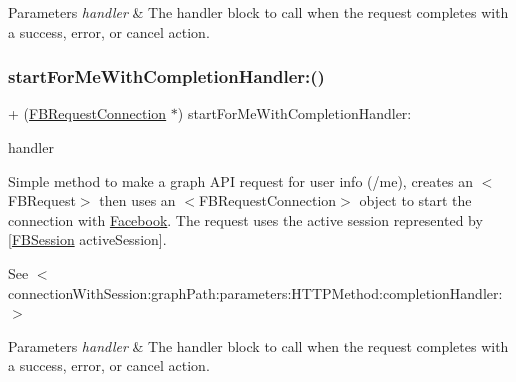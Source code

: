 \begin{DoxyParams}{Parameters}
{\em handler} & The handler block to call when the request completes with a success, error, or cancel action. \\
\hline
\end{DoxyParams}
\mbox{\label{interfaceFBRequestConnection_a9d89090f947eacfdf441172f842f5bc8}} 
\subsubsection{\texorpdfstring{start\+For\+Me\+With\+Completion\+Handler\+:()}{startForMeWithCompletionHandler:()}\hspace{0.1cm}{\footnotesize\ttfamily [2/5]}}
{\footnotesize\ttfamily + (\hyperlink{interfaceFBRequestConnection}{F\+B\+Request\+Connection} $\ast$) start\+For\+Me\+With\+Completion\+Handler\+: \begin{DoxyParamCaption}\item[{(F\+B\+Request\+Handler)}]{handler }\end{DoxyParamCaption}}

Simple method to make a graph A\+PI request for user info (/me), creates an $<$\+F\+B\+Request$>$ then uses an $<$\+F\+B\+Request\+Connection$>$ object to start the connection with \hyperlink{interfaceFacebook}{Facebook}. The request uses the active session represented by {\ttfamily \mbox{[}\hyperlink{interfaceFBSession}{F\+B\+Session} active\+Session\mbox{]}}.

See $<$connection\+With\+Session\+:graph\+Path\+:parameters\+:\+H\+T\+T\+P\+Method\+:completion\+Handler\+:$>$


\begin{DoxyParams}{Parameters}
{\em handler} & The handler block to call when the request completes with a success, error, or cancel action. \\
\hline
\end{DoxyParams}
\mbox{\label{interfaceFBRequestConnection_a9d89090f947eacfdf441172f842f5bc8}} 
